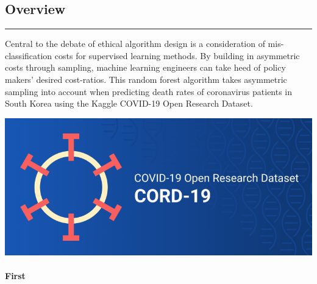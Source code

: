 \documentclass[
]{article}
\author{}
\date{\vspace{-2.5em}}
\begin{document}
{
\setcounter{tocdepth}{4}
\tableofcontents
}
\hypertarget{overview}{%
\subsection{Overview}\label{overview}}

\begin{center}\rule{0.5\linewidth}{0.5pt}\end{center}

Central to the debate of ethical algorithm design is a consideration of
mis-classification costs for supervised learning methods. By building in
asymmetric costs through sampling, machine learning engineers can take
heed of policy makers' desired cost-ratios. This random forest algorithm
takes asymmetric sampling into account when predicting death rates of
coronavirus patients in South Korea using the Kaggle COVID-19 Open
Research Dataset.

\includegraphics[width=600px]{images/covid}

\hypertarget{first}{%
\paragraph{First}\label{first}}
\end{document}

